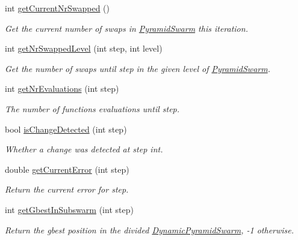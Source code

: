 \begin{CompactItemize}
int \hyperlink{classPsoStatistics_b40a0814c7489543ab403ca96deefbf8}{getCurrentNrSwapped} ()
\begin{CompactList}\small\item\em Get the current number of swaps in \hyperlink{classPyramidSwarm}{PyramidSwarm} this iteration. \item\end{CompactList}\item 
int \hyperlink{classPsoStatistics_510212cbbf51016b23b7fa5137da665d}{getNrSwappedLevel} (int step, int level)
\begin{CompactList}\small\item\em Get the number of swaps until step in the given level of \hyperlink{classPyramidSwarm}{PyramidSwarm}. \item\end{CompactList}\item 
int \hyperlink{classPsoStatistics_381381c8157a927f1c10eb1a0c7160e1}{getNrEvaluations} (int step)
\begin{CompactList}\small\item\em The number of functions evaluations until step. \item\end{CompactList}\item 
bool \hyperlink{classPsoStatistics_bb314ded9c4e4e3119c0db22946d5064}{isChangeDetected} (int step)
\begin{CompactList}\small\item\em Whether a change was detected at step int. \item\end{CompactList}\item 
double \hyperlink{classPsoStatistics_edd03fdca35f19935b9b503078d694df}{getCurrentError} (int step)
\begin{CompactList}\small\item\em Return the current error for step. \item\end{CompactList}\item 
int \hyperlink{classPsoStatistics_8f0897278274f87ddbc510a16f31bc33}{getGbestInSubswarm} (int step)
\begin{CompactList}\small\item\em Return the gbest position in the divided \hyperlink{classDynamicPyramidSwarm}{DynamicPyramidSwarm}, -1 otherwise. \item\end{CompactList}\item 

\end{CompactItemize}
